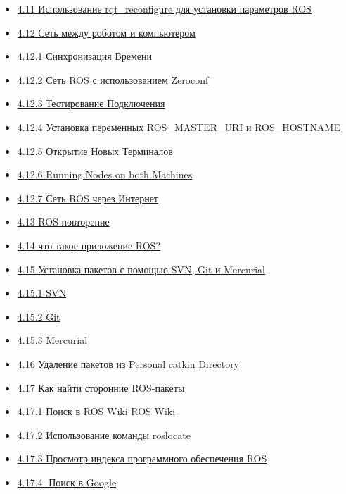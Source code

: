 \begin{itemize}
\item { \href{4.11-ispolzovanie-rqt_reconfigure-dlya-ustanovki-parametrov-ros.md}{4.11 Использование rqt\_reconfigure для установки параметров ROS}} 
\item { \href{4.12-set-mezhdu-robotom-i-kompyuterom.md}{4.12 Сеть между роботом и компьютером}} 
\item { \href{4.12.1-sinkhronizaciya-vremeni.md}{4.12.1 Синхронизация Времени}} 
\item { \href{4.12.2-set-ros-s-ispolzovaniem-zeroconf.md}{4.12.2 Сеть ROS с использованием Zeroconf}} 
\item { \href{4.12.3-testirovanie-podklyucheniya.md}{4.12.3 Тестирование Подключения}} 
\item { \href{4.12.4-ustanovka-peremennykh-ros_master_uri-i-ros_hostname.md}{4.12.4 Установка переменных ROS\_MASTER\_URI и ROS\_HOSTNAME}} 
\item { \href{4.12.5-otkrytie-novykh-terminalov.md}{4.12.5 Открытие Новых Терминалов}} 
\item { \href{4.12.6-running-nodes-on-both-machines.md}{4.12.6 Running Nodes on both Machines}} 
\item { \href{4.12.7-set-ros-cherez-internet.md}{4.12.7 Сеть ROS через Интернет}} 
\item { \href{untitled-7.md}{4.13 ROS повторение}} 
\item { \href{untitled-8.md}{4.14 что такое приложение ROS?}} 
\item { \href{untitled-9.md}{4.15 Установка пакетов с помощью SVN, Git и Mercurial}} 
\item { \href{4.15.1-svn.md}{4.15.1 SVN}} 
\item { \href{4.15.2-git.md}{4.15.2 Git}} 
\item { \href{4.15.3-mercurial.md}{4.15.3 Mercurial}} 
\item { \href{untitled-10.md}{4.16 Удаление пакетов из Personal catkin Directory}} 
\item { \href{untitled-11.md}{4.17 Как найти сторонние ROS-пакеты}} 
\item { \href{4.17.1-poisk-v-ros-wiki-ros-wiki.md}{4.17.1 Поиск в ROS Wiki ROS Wiki}} 
\item { \href{4.17.2-ispolzovanie-komandy-roslocate.md}{4.17.2 Использование команды roslocate}} 
\item { \href{4.17.3-prosmotr-indeksa-programmnogo-obespecheniya-ros.md}{4.17.3 Просмотр индекса программного обеспечения ROS}} 
\item { \href{4.17.4.-poisk-v-google.md}{4.17.4. Поиск в Google}} 

\end{itemize}
